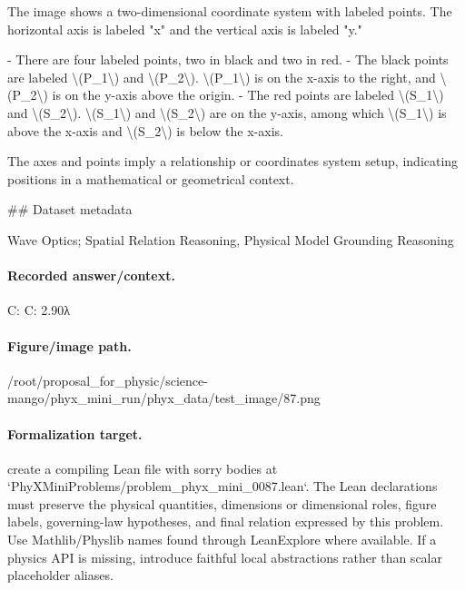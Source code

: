 The image shows a two-dimensional coordinate system with labeled points. The horizontal axis is labeled "x" and the vertical axis is labeled "y." 

- There are four labeled points, two in black and two in red.
- The black points are labeled \textbackslash{}(P\_1\textbackslash{}) and \textbackslash{}(P\_2\textbackslash{}). \textbackslash{}(P\_1\textbackslash{}) is on the x-axis to the right, and \textbackslash{}(P\_2\textbackslash{}) is on the y-axis above the origin.
- The red points are labeled \textbackslash{}(S\_1\textbackslash{}) and \textbackslash{}(S\_2\textbackslash{}). \textbackslash{}(S\_1\textbackslash{}) and \textbackslash{}(S\_2\textbackslash{}) are on the y-axis, among which \textbackslash{}(S\_1\textbackslash{}) is above the x-axis and \textbackslash{}(S\_2\textbackslash{}) is below the x-axis.

The axes and points imply a relationship or coordinates system setup, indicating positions in a mathematical or geometrical context.

\#\# Dataset metadata

Wave Optics; Spatial Relation Reasoning, Physical Model Grounding Reasoning

\paragraph{Recorded answer/context.}
C: C: 2.90λ

\paragraph{Figure/image path.}
/root/proposal\_for\_physic/science-mango/phyx\_mini\_run/phyx\_data/test\_image/87.png

\paragraph{Formalization target.}
create a compiling Lean file with sorry bodies at `PhyXMiniProblems/problem\_phyx\_mini\_0087.lean`. The Lean declarations must preserve the physical quantities, dimensions or dimensional roles, figure labels, governing-law hypotheses, and final relation expressed by this problem.
Use Mathlib/Physlib names found through LeanExplore where available. If a physics API is missing, introduce faithful local abstractions rather than scalar placeholder aliases.


